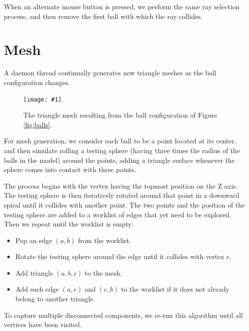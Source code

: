 \documentclass{article}
\newcommand\screenshot[1]{\texttt{[image: \#1]}}
\begin{document}
When an alternate mouse button is pressed, we perform
the same ray selection process, and then remove the
first ball with which the ray collides.

\section{Mesh}

A daemon thread continually generates new triangle
meshes as the ball configuration changes.

\begin{figure}[h!]
\centering
\screenshot{mesh}
\caption{The triangle mesh resulting from the ball
configuration of Figure \ref{fig:balls}.}
\label{fig:mesh}
\end{figure}

For mesh generation, we consider each ball to be
a point located at its center, and then simulate
rolling a testing sphere (having three times the radius
of the balls in the model) around the points,
adding a triangle surface whenever the sphere
comes into contact with three points.

The process begins with the vertex having the
topmost position on the Z axis. The testing sphere is
then iteratively rotated around that point in a downward
spiral until it collides with another point.
The two points and the position of the testing sphere
are added to a worklist of edges that yet need to be
explored.
Then we repeat until the worklist is empty:
\begin{itemize}
\item Pop an edge $(a,b)$ from the worklist.
\item Rotate the testing sphere around the edge until
      it collides with vertex $c$.
\item Add triangle $(a,b,c)$ to the mesh.
\item Add each edge $(a,c)$ and $(c,b)$ to the worklist
      if it does not already belong to another triangle.
\end{itemize}

To capture multiple disconnected components, we
re-run this algorithm until all vertices have
been visited.
\end{document}
